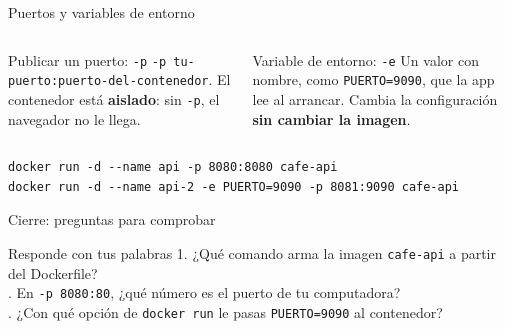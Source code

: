 \documentclass[aspectratio=169,10pt,c]{beamer}
\begin{document}
\begin{frame}[fragile]{Puertos y variables de entorno}
\begin{center}
\end{center}
\vspace{1mm}
\begin{columns}[T,onlytextwidth]
\begin{block}{Publicar un puerto: \texttt{-p}}
\small \texttt{-p tu-puerto:puerto-del-contenedor}. El contenedor está \textbf{aislado}: sin \texttt{-p}, el navegador no le llega.
\end{block}
\begin{block}{Variable de entorno: \texttt{-e}}
\small Un valor con nombre, como \texttt{PUERTO=9090}, que la app lee al arrancar. Cambia la configuración \textbf{sin cambiar la imagen}.
\end{block}
\end{columns}
\par\vspace{2mm}
\begin{lstlisting}
docker run -d --name api -p 8080:8080 cafe-api
docker run -d --name api-2 -e PUERTO=9090 -p 8081:9090 cafe-api
\end{lstlisting}
\end{frame}

\begin{frame}{Cierre: preguntas para comprobar}
\begin{block}{Responde con tus palabras}
\small
1. ¿Qué comando arma la imagen \texttt{cafe-api} a partir del Dockerfile?\\. En \texttt{-p 8080:80}, ¿qué número es el puerto de tu computadora?\\. ¿Con qué opción de \texttt{docker run} le pasas \texttt{PUERTO=9090} al contenedor?
\end{block}
\end{frame}
\end{document}
